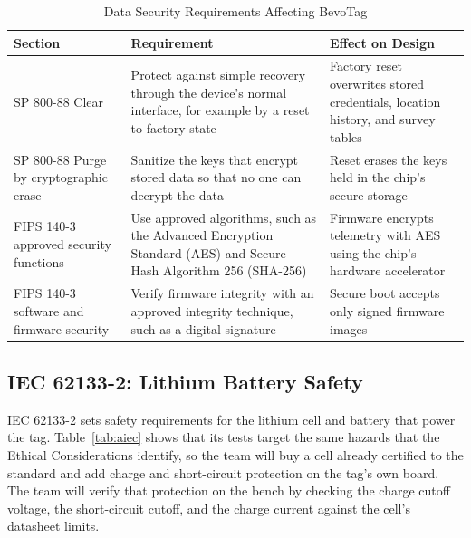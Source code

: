 \documentclass[12pt,letterpaper]{article}
\newenvironment{spectable}{\setstretch{1.0}\renewcommand{\arraystretch}{1.1}}{}
\begin{document}
\begin{table}[!htb]
\caption{Data Security Requirements Affecting BevoTag}
\label{tab:anist}
\centering
\begin{spectable}
\begin{tabularx}{\linewidth}{@{}L{1.7in} Y Y@{}}
\toprule
\textbf{Section} & \textbf{Requirement} & \textbf{Effect on Design} \\
\midrule
SP 800-88 Clear \cite{nist80088} & Protect against simple recovery through the device's normal interface, for example by a reset to factory state & Factory reset overwrites stored credentials, location history, and survey tables \\
SP 800-88 Purge by cryptographic erase \cite{nist80088} & Sanitize the keys that encrypt stored data so that no one can decrypt the data & Reset erases the keys held in the chip's secure storage \\
FIPS 140-3 approved security functions \cite{fips1403} & Use approved algorithms, such as the Advanced Encryption Standard (AES) and Secure Hash Algorithm 256 (SHA-256) & Firmware encrypts telemetry with AES using the chip's hardware accelerator \\
FIPS 140-3 software and firmware security \cite{fips1403} & Verify firmware integrity with an approved integrity technique, such as a digital signature & Secure boot accepts only signed firmware images \\
\bottomrule
\end{tabularx}
\end{spectable}
\end{table}

\subsection{IEC 62133-2: Lithium Battery Safety}
IEC 62133-2 \cite{iec62133} sets safety requirements for the lithium cell and battery that power
the tag. Table~\ref{tab:aiec} shows that its tests target the same hazards
that the Ethical Considerations identify, so the team will buy a cell already certified to the
standard and add charge and short-circuit protection on the tag's own board. The team will verify
that protection on the bench by checking the charge cutoff voltage, the short-circuit cutoff, and
the charge current against the cell's datasheet limits.
\end{document}
